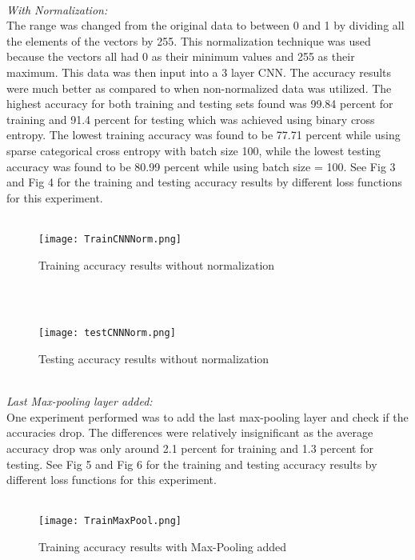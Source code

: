 \documentclass[journal]{IEEEtran}
\begin{document}
\\
\emph{With Normalization:}
\\
The range was changed from the original data to between 0 and 1 by dividing all the elements of the vectors by 255. This normalization technique was used because the vectors all had 0 as their minimum values and 255 as their maximum. This data was then input into a 3 layer CNN. The accuracy results were much better as compared to when non-normalized data was utilized. The highest accuracy for both training and testing sets found was 99.84 percent for training and 91.4 percent for testing which was achieved using binary cross entropy. The lowest training accuracy was found to be 77.71 percent while using sparse categorical cross entropy with batch size 100, while the lowest testing accuracy was found to be 80.99 percent while using batch size = 100. See Fig 3 and Fig 4 for the training and testing accuracy results by different loss functions for this experiment.
\\
\\
\begin{figure}[ht]
    \centering
    \texttt{[image: TrainCNNNorm.png]}
    \caption{Training accuracy results without normalization}
    \label{fig:my_label}
\end{figure}

\\

\\
\begin{figure}[ht]
    \centering
    \texttt{[image: testCNNNorm.png]}
    \caption{Testing accuracy results without normalization}
    \label{fig:my_label}
\end{figure}

\\

\emph{Last Max-pooling layer added:}
\\
One experiment performed was to add the last max-pooling layer and check if the accuracies drop. The differences were relatively insignificant as the average accuracy drop was only around 2.1 percent for training and 1.3 percent for testing. See Fig 5 and Fig 6 for the training and testing accuracy results by different loss functions for this experiment.
\\

\\
\begin{figure}[ht]
    \centering
    \texttt{[image: TrainMaxPool.png]}
    \caption{Training accuracy results with Max-Pooling added}
    \label{fig:my_label}
\end{figure}
\end{document}
